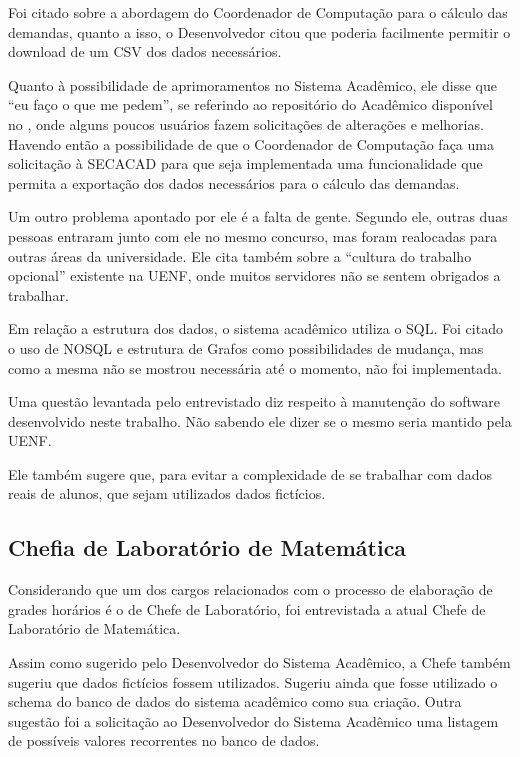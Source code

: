 Foi citado sobre a abordagem do Coordenador de Computação para o cálculo das demandas, quanto a isso, o Desenvolvedor citou que poderia facilmente permitir o download de um CSV dos dados necessários.

Quanto à possibilidade de aprimoramentos no Sistema Acadêmico, ele disse que ``eu faço o que me pedem'', se referindo ao repositório do Acadêmico disponível no , onde alguns poucos usuários fazem solicitações de alterações e melhorias. Havendo então a possibilidade de que o Coordenador de Computação faça uma solicitação à SECACAD para que seja implementada uma funcionalidade que permita a exportação dos dados necessários para o cálculo das demandas.

Um outro problema apontado por ele é a falta de gente. Segundo ele, outras duas pessoas entraram junto com ele no mesmo concurso, mas foram realocadas para outras áreas da universidade. Ele cita também sobre a ``cultura do trabalho opcional'' existente na UENF, onde muitos servidores não se sentem obrigados a trabalhar.

Em relação a estrutura dos dados, o sistema acadêmico utiliza o SQL. Foi citado o uso de NOSQL e estrutura de Grafos como possibilidades de mudança, mas como a mesma não se mostrou necessária até o momento, não foi implementada.

Uma questão levantada pelo entrevistado diz respeito à manutenção do software desenvolvido neste trabalho. Não sabendo ele dizer se o mesmo seria mantido pela UENF.

Ele também sugere que, para evitar a complexidade de se trabalhar com dados reais de alunos, que sejam utilizados dados fictícios.

\subsection{Chefia de Laboratório de Matemática} \label{ssec:3_Chefe} %

Considerando que um dos cargos relacionados com o processo de elaboração de grades horários é o de Chefe de Laboratório, foi entrevistada a atual Chefe de Laboratório de Matemática.

Assim como sugerido pelo Desenvolvedor do Sistema Acadêmico, a Chefe também sugeriu que dados fictícios fossem utilizados. Sugeriu ainda que fosse utilizado o schema do banco de dados do sistema acadêmico como sua criação. Outra sugestão foi a solicitação ao Desenvolvedor do Sistema Acadêmico uma listagem de possíveis valores recorrentes no banco de dados.

